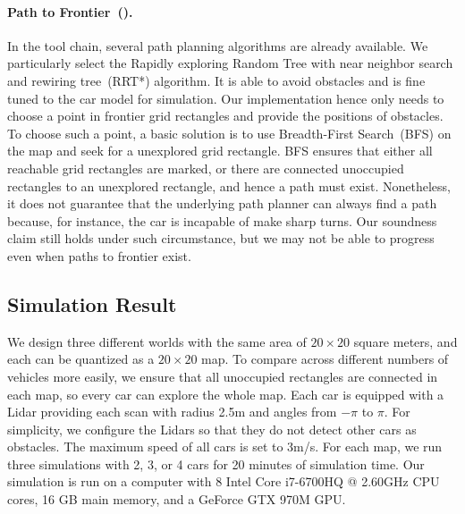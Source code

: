 \paragraph{Path to Frontier~(\PathToFrontier).}
In the \CyPhyHouse tool chain, several path planning algorithms are already available.
We particularly select the Rapidly exploring Random Tree with near neighbor search and rewiring tree~(RRT*) algorithm.
It is able to avoid obstacles and is fine tuned to the car model for simulation.
Our \PathToFrontier implementation hence only needs to choose a point in frontier grid rectangles and provide the positions of obstacles.
To choose such a point, a basic solution is to use Breadth-First Search~(BFS) on the map and seek for a unexplored grid rectangle.
BFS ensures that either all reachable grid rectangles are marked,
or there are connected unoccupied rectangles to an unexplored rectangle, and hence a path must exist.
Nonetheless, it does not guarantee that the underlying path planner can always find a path because,
for instance, the car is incapable of make sharp turns.
Our soundness claim still holds under such circumstance, but we may not be able to progress even when paths to frontier exist.


\subsection{Simulation Result}

We design three different worlds with the same area of $20\times20$ square meters,
and each can be quantized as a $20 \times 20$ map.
To compare across different numbers of vehicles more easily,
we ensure that all unoccupied rectangles are connected in each map,
so every car can explore the whole map.
Each car is equipped with a Lidar providing each scan with radius 2.5m and angles from $-\pi$ to $\pi$.
For simplicity, we configure the Lidars so that they do not detect other cars as obstacles.
The maximum speed of all cars is set to 3m/s.
For each map, we run three simulations with 2, 3, or 4 cars for 20 minutes of simulation time.
Our simulation is run on a computer with 8 Intel Core i7-6700HQ @ 2.60GHz CPU cores, 16 GB main memory, and a GeForce GTX 970M GPU.


